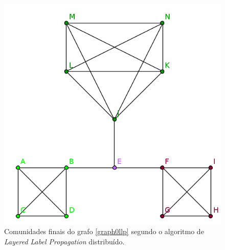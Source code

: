 \begin{figure}[h]
  \center
  \includegraphics{graph1_end}
  \caption{Comunidades finais do grafo \ref{graph0llp} segundo o algoritmo de 
\textit{Layered Label Propagation} distribuído.}
\end{figure}
